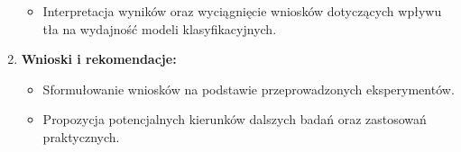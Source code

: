 \begin{enumerate}
\begin{itemize}
        \item Interpretacja wyników oraz wyciągnięcie wniosków dotyczących wpływu tła na wydajność modeli 
        klasyfikacyjnych.
    \end{itemize}
    \item \textbf{Wnioski i rekomendacje:}
    \begin{itemize}
        \item Sformułowanie wniosków na podstawie przeprowadzonych eksperymentów.
        \item Propozycja potencjalnych kierunków dalszych badań oraz zastosowań praktycznych.
    \end{itemize}
\end{enumerate}